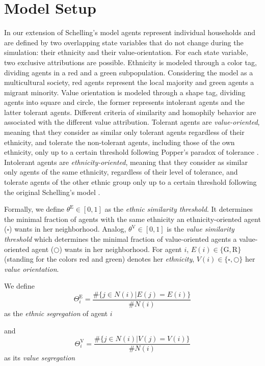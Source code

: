 \documentclass{ws-acs}
\begin{document}
\section{Model Setup}
In our extension of Schelling's model agents represent individual households and are defined by two overlapping state variables that do not change during the simulation: their ethnicity and their value-orientation. For each state variable, two exclusive attributions are possible. Ethnicity is modeled through a color tag, dividing agents in a red and a green subpopulation. Considering the model as a multicultural society, red agents represent the local majority and green agents  a migrant minority. Value orientation is modeled through a shape tag, dividing agents into square and circle, the former represents intolerant agents and the latter tolerant agents. Different criteria of similarity and homophily behavior are associated with the different value attribution. Tolerant agents are {\it value-oriented}, meaning that they consider as similar only tolerant agents regardless of their ethnicity, and tolerate the non-tolerant agents, including those of the own ethnicity, only up to a certain threshold following Popper's paradox of tolerance \cite{popper45}. Intolerant agents are {\it ethnicity-oriented}, meaning that they consider as similar only agents of the same ethnicity, regardless of their level of tolerance, and tolerate agents of the other ethnic group only up to a certain threshold following the original Schelling's model \cite{schelling69}.

Formally, we define $\theta^\text{E} \in [0,1]$ as the {\it ethnic similarity threshold}. It determines the minimal fraction of agents with the same ethnicity an ethnicity-oriented agent ($\square$) wants in her neighborhood. Analog, $\theta^\text{V} \in [0,1]$ is the {\it value similarity threshold} which determines the minimal fraction of value-oriented agents a value-oriented agent ($\bigcirc$) wants in her neighborhood. For agent $i$, $E(i) \in \{\text{G},\text{R}\}$ (standing for the colors red and green) denotes her {\it ethnicity}, $V(i) \in \{\square,\bigcirc\}$ her {\it value orientation}.

We define
\begin{equation} \label{eq:ethnic segregation}
\Theta^\text{E}_i = \frac{\#\{j \in N(i) | E(j)=E(i)\}}{\#N(i)}
\end{equation}
as the {\it ethnic segregation} of agent $i$

and 
\begin{equation}\label{eq:value segregation}
\Theta^\text{V}_i = \frac{\#\{j \in N(i) | V(j)=V(i)\}}{\#N(i)} 
\end{equation}
as its {\it value segregation}
\end{document}
